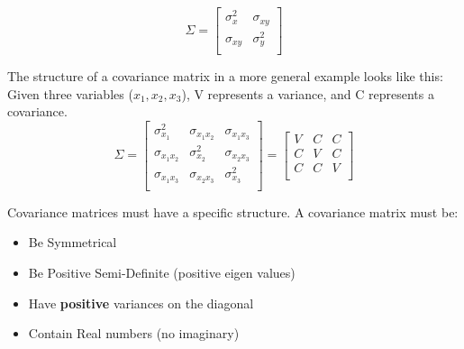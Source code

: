 \[
\Sigma =
\begin{bmatrix}
\sigma_{x}^2 & \sigma_{xy} \\
\sigma_{xy} & \sigma_{y}^2 \\
\end{bmatrix}
\]

The structure of a covariance matrix in a more general example looks like this:
Given three variables ($x_1,x_2,x_3$), V represents a variance, and C represents a covariance.
\[
\Sigma = 
\begin{bmatrix}
\sigma_{x_1}^2 & \sigma_{x_1x_2} & \sigma_{x_1x_3} \\
\sigma_{x_1x_2} & \sigma_{x_2}^2 & \sigma_{x_2x_3} \\
\sigma_{x_1x_3} & \sigma_{x_2x_3} & \sigma_{x_3}^2 \\
\end{bmatrix}
=
\begin{bmatrix}
V & C & C \\
C & V & C \\
C & C & V \\
\end{bmatrix}
\]

Covariance matrices must have a specific structure.  A covariance matrix must be:
\begin{itemize}
	\item Be Symmetrical
	\item Be Positive Semi-Definite (positive eigen values)
	\item Have \textbf{positive} variances on the diagonal
	\item Contain Real numbers (no imaginary)
\end{itemize}